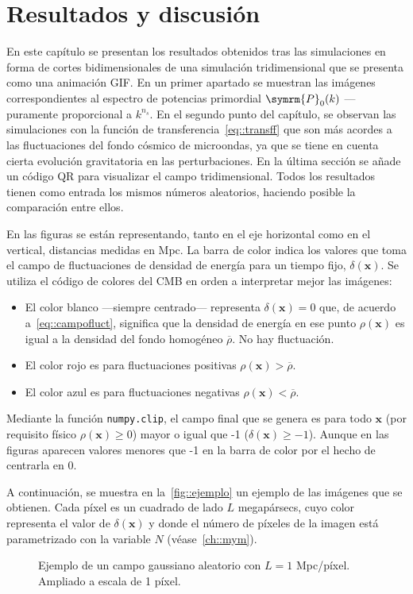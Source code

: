 \chapter{Resultados y discusión}
En este capítulo se presentan los resultados obtenidos tras las simulaciones en forma de cortes bidimensionales de una simulación tridimensional que se presenta como una animación GIF. En un primer apartado se muestran las imágenes correspondientes al espectro de potencias primordial \(\symrm{P}_0(k)\) ---puramente proporcional a \(k^{n_s}\). En el segundo punto del capítulo, se observan las simulaciones con la función de transferencia~\eqref{eq::transff} que son más acordes a las fluctuaciones del fondo cósmico de microondas, ya que se tiene en cuenta cierta evolución gravitatoria en las perturbaciones. En la última sección se añade un código QR para visualizar el campo tridimensional. Todos los resultados tienen como entrada los mismos números aleatorios, haciendo posible la comparación entre ellos.

En las figuras se están representando, tanto en el eje horizontal como en el vertical, distancias medidas en Mpc. La barra de color indica los valores que toma el campo de fluctuaciones de densidad de energía para un tiempo fijo, \(\delta(\symbf{x})\). Se utiliza el código de colores del CMB en orden a interpretar mejor las imágenes:
\begin{itemize}
    \item El color blanco ---siempre centrado--- representa \(\delta(\symbf{x})=0\) que, de acuerdo a~\eqref{eq::campofluct}, significa que la densidad de energía en ese punto \(\rho(\symbf{x})\) es igual a la densidad del fondo homogéneo \(\overbar{\rho}\). No hay fluctuación.
    \item El color rojo es para fluctuaciones positivas \(\rho(\symbf{x})>\overbar{\rho}\).
    \item El color azul es para fluctuaciones negativas \(\rho(\symbf{x})<\overbar{\rho}\).
\end{itemize}
Mediante la función \texttt{numpy.clip}, el campo final que se genera es para todo \(\symbf{x}\) (por requisito físico \(\rho(\symbf{x})\geq 0\)) mayor o igual que -1 (\(\delta(\symbf{x})\geq -1\)). Aunque en las figuras aparecen valores menores que -1 en la barra de color por el hecho de centrarla en 0.

A continuación, se muestra en la~\autoref{fig::ejemplo} un ejemplo de las imágenes que se obtienen. Cada píxel es un cuadrado de lado \(L\) megapársecs, cuyo color representa el valor de \(\delta(\symbf{x})\) y donde el número de píxeles de la imagen está parametrizado con la variable \(N\) (véase~\autoref{ch::mym}).
\begin{figure}[ht]
    \centering
    \scalebox{.9}{}
    \caption[Ejemplo de un campo gaussiano aleatorio con \(L=1\) Mpc/píxel]{Ejemplo de un campo gaussiano aleatorio con \(L=1\) Mpc/píxel. Ampliado a escala de 1 píxel.}
    \label{fig::ejemplo}
\end{figure}

